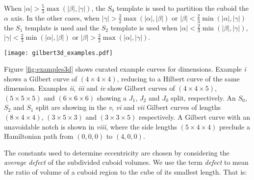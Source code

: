 When $|\alpha| > \frac{5}{3} \max(|\beta|, |\gamma|)$, the $S_0$ template is used to partition the cuboid the $\alpha$ axis.
In the other cases, when $|\gamma| > \frac{3}{2} \max(|\alpha|, |\beta|)$ or $|\beta| < \frac{2}{3} \min(|\alpha|, |\gamma|)$ the $S_1$
template is used and the $S_2$ template is used when
$|\alpha| < \frac{2}{3} \min(|\beta|, |\gamma|)$,
$|\gamma| < \frac{2}{3} \min(|\alpha|, |\beta|)$ or
$|\beta| > \frac{3}{2} \max(|\alpha|, |\gamma|)$.

\begin{figure*}[ht]
  \centering
  \texttt{[image: gilbert3d\_examples.pdf]}
  \caption{ Examples
  of 3D Gilbert curves highlighting different aspects of the algorithm.
  i) $(4 \times 4 \times 4)$, equivalent to the Hilbert curve of the same side lengths.
  ii) $(4 \times 4 \times 5)$ show a $J_1$ split subdivision scheme.
  iii) $(5 \times 5 \times 5)$, shows a $J_2$ split subdivision scheme.
  iv) $(6 \times 6 \times 6)$, shows a $J_0$ subdivision scheme.
  v) $(8 \times 4 \times 4)$, shows an $S_0$ subdivision scheme, splitting on the $\alpha$ dimension.
  vi) $(3 \times 5 \times 3)$, shows an $S_2$ subdivision scheme.
  vii) $(3 \times 3 \times 5)$, shows an $S_1$ subdivision scheme.
  viii) $(5 \times 4 \times 4)$, shows an example of a configuration where a diagonal move (\textit{notch}) is formed
  as there's no Hamiltonian path possible for the given endpoints.
  }
  \label{fig:examples3d}
\end{figure*}


Figure \ref{fig:examples3d} shows curated example curves for dimensions.
Example \textit{i} shows a Gilbert curve of $(4 \times 4 \times 4)$, reducing to a Hilbert curve of the same dimension.
Examples \textit{ii}, \textit{iii} and \textit{iv} show Gilbert curves of $(4 \times 4 \times 5)$, $(5 \times 5 \times 5)$
and $(6 \times 6 \times 6)$ showing a $J_1$, $J_2$ and $J_0$ split, respectively.
An $S_0$, $S_2$ and $S_1$ split are showing in the \textit{v}, \textit{vi} and \textit{vii} Gilbert curves of
lengths $(8 \times 4 \times 4)$, $(3 \times 5 \times 3)$ and $(3 \times 3 \times 5)$ respectively.
A Gilbert curve with an unavoidable notch is 
shown in \textit{viii}, where the side lengths $(5 \times 4 \times 4)$ preclude a Hamiltonian path from $(0,0,0)$ to $(4,0,0)$.


The constants used to determine eccentricity are chosen by considering the \textit{average defect} of the subdivided cuboid volumes.
We use the term \textit{defect} to mean the ratio of volume of a cuboid region to the cube of its smallest length.
That is:

